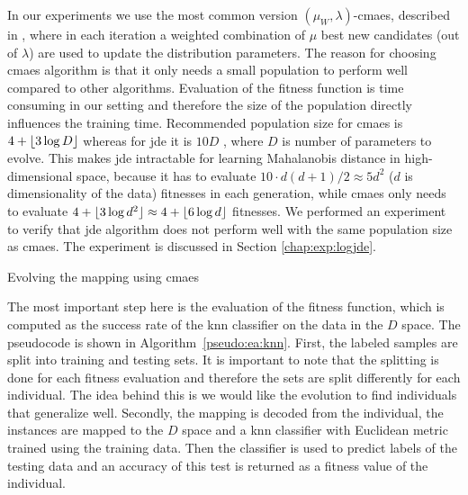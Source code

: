 \documentclass[12pt,a4paper]{report}
\begin{document}
In our experiments we use the most common version $(\mu_W, \lambda)$-\ac{cmaes}, described in \cite{hansen2001completely}, where in each iteration a weighted combination of $\mu$ best new candidates (out of $\lambda$) are used to update the distribution parameters. The reason for choosing \ac{cmaes} algorithm is that it only needs a small population to perform well compared to other algorithms. Evaluation of the fitness function is time consuming in our setting and therefore the size of the population directly influences the training time. Recommended population size for \ac{cmaes} is $4+\lfloor3\log{D}\rfloor$ \citep{hansen2006cma} whereas for \ac{jde} it is $10D$ \citep{brest2006self}, where $D$ is number of parameters to evolve. This makes \ac{jde} intractable for learning Mahalanobis distance in high-dimensional space, because it has to evaluate $10\cdot d(d+1)/2 \approx 5d^2$ ($d$ is dimensionality of the data) fitnesses in each generation, while \ac{cmaes} only needs to evaluate $4+\lfloor3\log{d^2}\rfloor \approx 4+\lfloor6\log{d}\rfloor$ fitnesses. We performed an experiment to verify that \ac{jde} algorithm does not perform well with the same population size as \ac{cmaes}. The experiment is discussed in Section \ref{chap:exp:logjde}.

\begin{algorithm}[t]
\caption{Evolving the mapping using \ac{cmaes}} \label{pseudo:our-method}
\DontPrintSemicolon
\LinesNumbered
{}
\end{algorithm} 

The most important step here is the evaluation of the fitness function, which is computed as the success rate of the \ac{knn} classifier on the data in the $D$ space. The pseudocode is shown in Algorithm~\ref{pseudo:ea:knn}. First, the labeled samples are split into training and testing sets. It is important to note that the splitting is done for each fitness evaluation and therefore the sets are split differently for each individual. The idea behind this is we would like the evolution to find individuals that generalize well. Secondly, the mapping is decoded from the individual, the instances are mapped to the $D$ space and a \ac{knn} classifier with Euclidean metric trained using the training data. Then the classifier is used to predict labels of the testing data and an accuracy of this test is returned as a fitness value of the individual.
\end{document}
